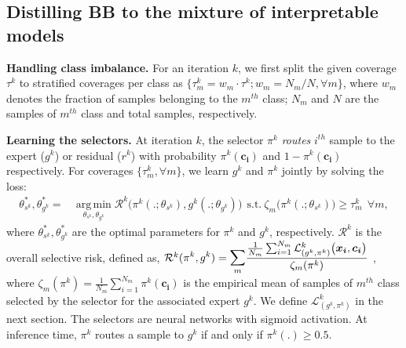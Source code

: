 \subsection{Distilling BB to the mixture of interpretable models}
\noindent\textbf{Handling class imbalance.} For an iteration $k$, we first split the given coverage $\tau^k$ to stratified coverages per class as $\{\tau^k_m = w_m \cdot \tau^k; w_m=N_m/N, \forall m\}$, where $w_m$ denotes the fraction of samples belonging to the $m^{th}$ class; $N_m$ and $N$ are the samples of $m^{th}$ class and total samples, respectively. 

\noindent \textbf{Learning the selectors.}
At iteration $k$, the selector $\pi^k$ \emph{routes} $i^{th}$ sample to the expert ($g^k$) or residual ($r^k$) with probability $\displaystyle \pi^k(\boldsymbol{c_i})$ and $\displaystyle 1 - \pi^k(\boldsymbol{c_i})$ respectively. 
For coverages $\{\tau^k_m, \forall m\}$, we learn $g^k$ and $\pi^k$ jointly by solving the 
loss:
\begin{align}
\label{equ: optimization_g}
\theta_{s^k}^*, \theta_{g^k}^* = & \operatorname*{arg\,min}_{\theta_{s^k}, \theta_{g^k}} \mathcal{R}^k\Big(\pi^k(.; \theta_{s^k}), \displaystyle g^k(.; \theta_{g^k}) \Big) 
~~\text{s.t.}~\zeta_m\big(\pi^k(.; \theta_{s^k})\big) \geq \tau^k_m ~~\forall m,
\end{align}
where $\theta_{s^k}^*, \theta_{g^k}^*$ are the optimal parameters for $\pi^k$ and $g^k$, respectively.
$\mathcal{R}^k$ is the overall selective risk, defined as,
$\mathcal{R}^k(\displaystyle \pi^k, \displaystyle g^k) = \mathlarger{\sum}_m\frac{\frac{1}{N_m}\sum_{i=1}^{N_m}\mathcal{L}_{(g^k, \pi^k)}^k\big(\boldsymbol{x_i}, \boldsymbol{c_i}\big)}{\zeta_m(\pi^k)}$ ,
where $\zeta_m(\pi^k) = \frac{1}{N_m}\sum_{i=1}^{N_m}\pi^k(\boldsymbol{c_i})$ is the empirical mean of samples of $m^{th}$ class selected by the selector for the associated expert $\displaystyle g^k$. We define $\mathcal{L}_{(g^k, \pi^k)}^k$ in the next section.
The selectors are neural networks with sigmoid activation. At inference time, $\pi^k$ routes a sample  to $\displaystyle g^k$ if and only if $\pi^k(.)\geq 0.5$. 

